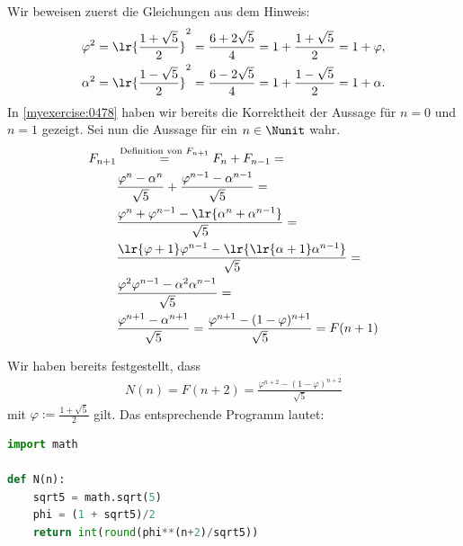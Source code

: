 \begin{myanswer}[myexercise:0477]
	Wir beweisen zuerst die Gleichungen aus dem Hinweis:
	\begin{align*}
		\varphi^2 & = \lr{\frac{1+\sqrt{5}}{2}}^2 = \frac{6+2\sqrt{5}}{4} = 1 + \frac{1+\sqrt{5}}{2} = 1 + \varphi, \\
		\alpha^2  & = \lr{\frac{1-\sqrt{5}}{2}}^2 = \frac{6-2\sqrt{5}}{4} = 1 + \frac{1-\sqrt{5}}{2} = 1 + \alpha.
	\end{align*}
	In \cref{myexercise:0478} haben wir bereits die Korrektheit der Aussage für $n=0$ und $n=1$ gezeigt. Sei nun die Aussage für ein $n\in\Nunit$ wahr.
	\begin{align*}
		F_{n+1} & \stackrel{\text{Definition von $F_{n+1}$}}{=} F_n + F_{n-1} =                                           \\
		        & \frac{\varphi^{n}-\alpha^{n}}{\sqrt{5}} + \frac{\varphi^{n-1}-\alpha^{n-1}}{\sqrt{5}} =                 \\
		        & \frac{\varphi^{n} + \varphi^{n-1} - \lr{\alpha^{n}+\alpha^{n-1}}}{\sqrt{5}} =                           \\
		        & \frac{\lr{\varphi + 1}\varphi^{n-1} - \lr{\lr{\alpha + 1}\alpha^{n-1}}}{\sqrt{5}} =                     \\
		        & \frac{\varphi^2\varphi^{n-1} - \alpha^2\alpha^{n-1}}{\sqrt{5}} =                                        \\
		        & \frac{\varphi^{n+1}-\alpha^{n+1}}{\sqrt{5}} = \frac{\varphi^{n+1}-(1-\varphi)^{n+1}}{\sqrt{5}} = F(n+1)
	\end{align*}
\end{myanswer}


\begin{myanswer}[myexercise:0406]
	Wir haben bereits festgestellt, dass
	\begin{align*}
		N(n) = F(n+2) = \frac{\varphi^{n+2}-(1-\varphi)^{n+2}}{\sqrt{5}}
	\end{align*}
	mit $\varphi := \frac{1+\sqrt{5}}{2}$ gilt. Das entsprechende Programm lautet:
	\begin{lstlisting}[language=Python]
import math

def N(n):
    sqrt5 = math.sqrt(5)
    phi = (1 + sqrt5)/2
    return int(round(phi**(n+2)/sqrt5))
\end{lstlisting}
\end{myanswer}

\clearpage
\shipoutAnswer
